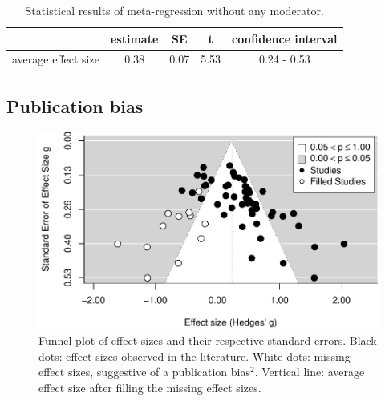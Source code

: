 \documentclass[
  english,
  man]{apa6}
\begin{document}
\begin{table}[tbp]

\begin{center}
\begin{threeparttable}

\caption{\label{tab:Table1}Statistical results of meta-regression without any moderator.}

\begin{tabular}{lcccc}
\toprule
 & estimate & SE & t & confidence interval\\
\midrule
average effect size & 0.38 & 0.07 & 5.53 & 0.24 - 0.53\\
\bottomrule
\end{tabular}

\end{threeparttable}
\end{center}

\end{table}

\hypertarget{publication-bias}{%
\subsection{Publication bias}\label{publication-bias}}

\begin{figure}
\centering
\includegraphics{MA_speech_pref_files/figure-latex/bias-1.pdf}
\caption{\label{fig:bias}Funnel plot of effect sizes and their respective standard errors. Black dots: effect sizes observed in the literature. White dots: missing effect sizes, suggestive of a publication bias\(^2\). Vertical line: average effect size after filling the missing effect sizes.}
\end{figure}
\end{document}
